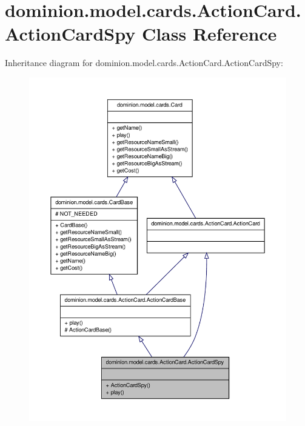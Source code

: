 \hypertarget{classdominion_1_1model_1_1cards_1_1ActionCard_1_1ActionCardSpy}{\section{dominion.\-model.\-cards.\-Action\-Card.\-Action\-Card\-Spy \-Class \-Reference}
\label{classdominion_1_1model_1_1cards_1_1ActionCard_1_1ActionCardSpy}
}


\-Inheritance diagram for dominion.\-model.\-cards.\-Action\-Card.\-Action\-Card\-Spy\-:
\nopagebreak
\begin{figure}[H]
\begin{center}
\leavevmode
\includegraphics[width=350pt]{classdominion_1_1model_1_1cards_1_1ActionCard_1_1ActionCardSpy__inherit__graph}
\end{center}
\end{figure}



